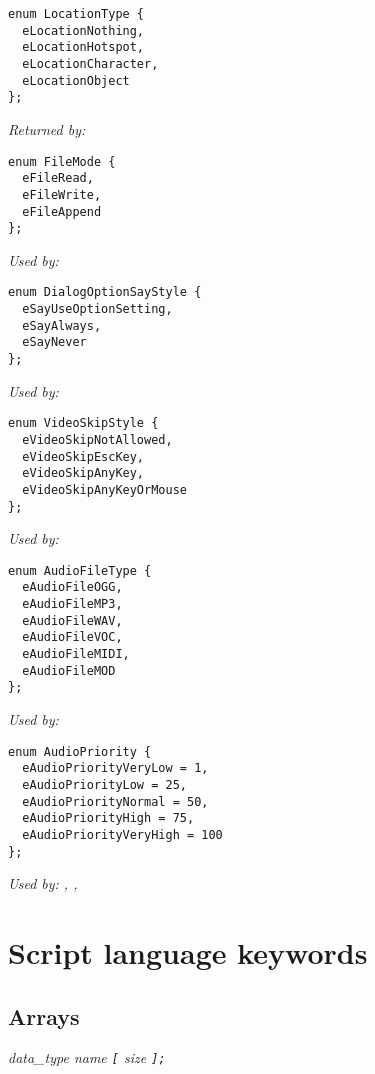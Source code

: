 \begin{verbatim}
enum LocationType {
  eLocationNothing,
  eLocationHotspot,
  eLocationCharacter,
  eLocationObject
};
\end{verbatim}
\it{Returned by:} 

\begin{verbatim}
enum FileMode {
  eFileRead,
  eFileWrite,
  eFileAppend
};
\end{verbatim}
\it{Used by:} 

\begin{verbatim}
enum DialogOptionSayStyle {
  eSayUseOptionSetting,
  eSayAlways,
  eSayNever
};
\end{verbatim}
\it{Used by:} 

\begin{verbatim}
enum VideoSkipStyle {
  eVideoSkipNotAllowed,
  eVideoSkipEscKey,
  eVideoSkipAnyKey,
  eVideoSkipAnyKeyOrMouse
};
\end{verbatim}
\it{Used by:} 

\begin{verbatim}
enum AudioFileType {
  eAudioFileOGG,
  eAudioFileMP3,
  eAudioFileWAV,
  eAudioFileVOC,
  eAudioFileMIDI,
  eAudioFileMOD
};
\end{verbatim}
\it{Used by:} 

\begin{verbatim}
enum AudioPriority {
  eAudioPriorityVeryLow = 1,
  eAudioPriorityLow = 25,
  eAudioPriorityNormal = 50,
  eAudioPriorityHigh = 75,
  eAudioPriorityVeryHigh = 100
};
\end{verbatim}
\it{Used by:} ,
,


\section{Script language keywords}


\subsection{Arrays}\label{Arrays}%

\it{data_type} \it{name} \verb$[$ \it{size} \verb$];$

